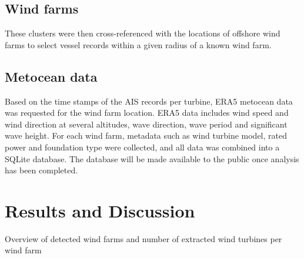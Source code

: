 \documentclass[wes, manuscript]{copernicus}
\begin{document}
\subsection{Wind farms}
These clusters were then cross-referenced with the 
locations of offshore wind farms to select vessel records within a given radius of a 
known wind farm. 

\subsection{Metocean data}
Based on the time stamps of the AIS records per turbine, ERA5 metocean data was 
requested for the wind farm location. ERA5 data includes wind speed and wind direction at several 
altitudes, wave direction, wave period and significant wave height. For each wind farm, 
metadata such as wind turbine model, rated power and foundation type were collected, 
and all data was combined into a SQLite database. The database will be made available 
to the public once analysis has been completed. 

\clearpage
\newpage

\section{Results and Discussion}

\begin{table}[ht]
    \caption[]{Overview of detected wind farms and number of extracted wind turbines per wind farm}
    \centering
    
    \label{tab:installations}
\end{table}

\clearpage
\newpage
\end{document}
